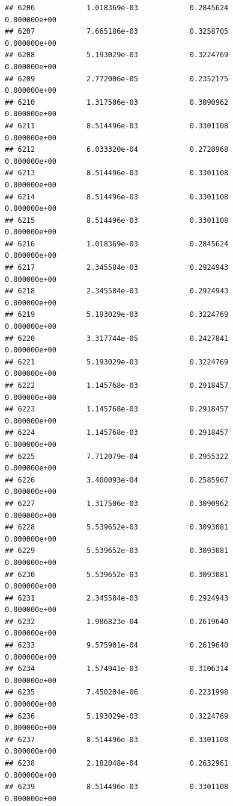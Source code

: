 \documentclass[
]{article}
\begin{document}
\begin{verbatim}
## 6206            1.018369e-03            0.2845624            0.000000e+00
## 6207            7.665186e-03            0.3258705            0.000000e+00
## 6208            5.193029e-03            0.3224769            0.000000e+00
## 6209            2.772006e-05            0.2352175            0.000000e+00
## 6210            1.317506e-03            0.3090962            0.000000e+00
## 6211            8.514496e-03            0.3301108            0.000000e+00
## 6212            6.033320e-04            0.2720968            0.000000e+00
## 6213            8.514496e-03            0.3301108            0.000000e+00
## 6214            8.514496e-03            0.3301108            0.000000e+00
## 6215            8.514496e-03            0.3301108            0.000000e+00
## 6216            1.018369e-03            0.2845624            0.000000e+00
## 6217            2.345584e-03            0.2924943            0.000000e+00
## 6218            2.345584e-03            0.2924943            0.000000e+00
## 6219            5.193029e-03            0.3224769            0.000000e+00
## 6220            3.317744e-05            0.2427841            0.000000e+00
## 6221            5.193029e-03            0.3224769            0.000000e+00
## 6222            1.145768e-03            0.2918457            0.000000e+00
## 6223            1.145768e-03            0.2918457            0.000000e+00
## 6224            1.145768e-03            0.2918457            0.000000e+00
## 6225            7.712079e-04            0.2955322            0.000000e+00
## 6226            3.400093e-04            0.2585967            0.000000e+00
## 6227            1.317506e-03            0.3090962            0.000000e+00
## 6228            5.539652e-03            0.3093081            0.000000e+00
## 6229            5.539652e-03            0.3093081            0.000000e+00
## 6230            5.539652e-03            0.3093081            0.000000e+00
## 6231            2.345584e-03            0.2924943            0.000000e+00
## 6232            1.986823e-04            0.2619640            0.000000e+00
## 6233            9.575901e-04            0.2619640            0.000000e+00
## 6234            1.574941e-03            0.3106314            0.000000e+00
## 6235            7.450204e-06            0.2231998            0.000000e+00
## 6236            5.193029e-03            0.3224769            0.000000e+00
## 6237            8.514496e-03            0.3301108            0.000000e+00
## 6238            2.182048e-04            0.2632961            0.000000e+00
## 6239            8.514496e-03            0.3301108            0.000000e+00

\end{verbatim}
\end{document}

